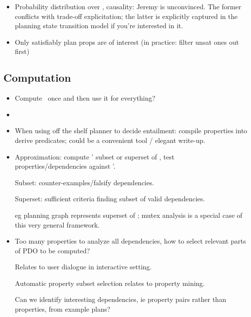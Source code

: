 \begin{itemize}
\item Probability distribution over \plans, causality: Jeremy is
  unconvinced. The former conflicts with trade-off explicitation; the
  latter is explicitly captured in the planning state transition model
  if you're interested in it.

\item Only satisfiably plan props are of interest (in practice: filter
  unsat ones out first)

\end{itemize}




\subsection{Computation}

\begin{itemize}
\item Compute \plans\ once and then use it for everything?

\item {}

\item When using off the shelf planner to decide entailment: compile
  properties into derive predicates; could be a convenient tool /
  elegant write-up.

\item Approximation: compute \plans' subset or superset of \plans, test
  properties/dependencies against \plans'.

  Subset: counter-examples/falsify dependencies.

  Superset: sufficient criteria finding subset of valid dependencies.

  eg planning graph represents superset of \plans; mutex analysis is a
  special case of this very general framework.

\item Too many properties to analyze all dependencies, how to select
  relevant parts of PDO to be computed?

  Relates to user dialogue in interactive setting.

  Automatic property subset selection relates to property mining.

  Can we identify interesting dependencies, ie property pairs rather
  than properties, from example plans?

\end{itemize}





